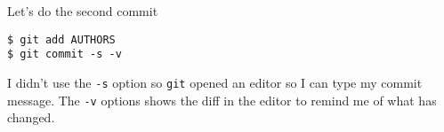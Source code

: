 \documentclass[a4paper]{article}
\newcommand{\OF}{\texttt{OpenFOAM}\xspace}
\newcommand{\GIT}{\texttt{git}\xspace}
\begin{document}
Let's do the second commit
\begin{verbatim}
$ git add AUTHORS
$ git commit -s -v
\end{verbatim}
I didn't use the \texttt{-s} option so \GIT opened an editor so I can type my
commit message. The \texttt{-v} options shows the diff in the editor to remind
me of what has changed.


% 
% 
% 
\end{document}
